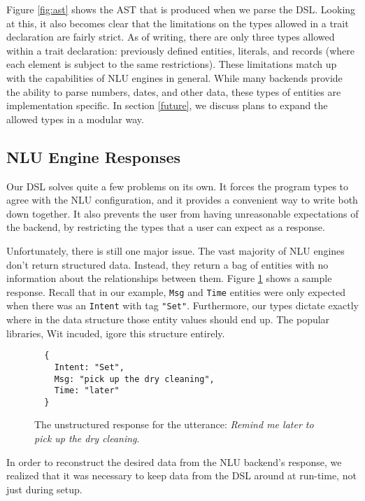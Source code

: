\documentclass[twocolumn]{article}
\newcommand{\ts}[1]{\texttt{#1}}
\begin{document}
Figure \ref{fig:ast} shows the AST that is produced when we parse the DSL.
Looking at this, it also becomes clear that the limitations on the types allowed
in a trait declaration are fairly strict. As of writing, there are only three
types allowed within a trait declaration: previously defined entities, literals,
and records (where each element is subject to the same restrictions). These
limitations match up with the capabilities of NLU engines in general. While many
backends provide the ability to parse numbers, dates, and other data, these
types of entities are implementation specific. In section \ref{future}, we
discuss plans to expand the allowed types in a modular way.

\subsection{NLU Engine Responses}
Our DSL solves quite a few problems on its own. It forces the program types to
agree with the NLU configuration, and it provides a convenient way to write both
down together. It also prevents the user from having unreasonable expectations
of the backend, by restricting the types that a user can expect as a response.

Unfortunately, there is still one major issue. The vast majority of NLU engines
don't return structured data. Instead, they return a bag of entities with no
information about the relationships between them. Figure \ref{fig:nostructure}
shows a sample response. Recall that in our example, \ts{Msg} and \ts{Time}
entities were only expected when there was an \ts{Intent} with tag \ts{"Set"}.
Furthermore, our types dictate exactly where in the data structure those entity
values should end up. The popular libraries, Wit incuded, igore this structure
entirely.

\begin{figure}
\begin{verbatim}
  {
    Intent: "Set",
    Msg: "pick up the dry cleaning",
    Time: "later"
  }
\end{verbatim}
  \caption{The unstructured response for the utterance: \emph{Remind me later to
      pick up the dry cleaning}.}
  \label{fig:nostructure}
\end{figure}

In order to reconstruct the desired data from the NLU backend's response, we
realized that it was necessary to keep data from the DSL around at run-time, not
just during setup.
\end{document}
